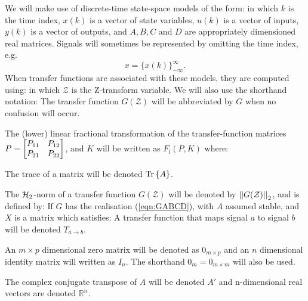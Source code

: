 \label{sec:notation}
We will make use of discrete-time state-space models of the form:
in which $k$ is the time index, $x(k)$ is a vector of state variables, $u(k)$ is a vector of inputs, $y(k)$ is a vector of outputs, and $A,B,C$ and $D$ are appropriately dimensioned real matrices. Signals will sometimes be represented by omitting the time index, e.g.
$$x=\{x(k)\}^{\infty}_{-\infty}.$$
When transfer functions are associated with these models, they are computed using:
in which $\mathcal{Z}$ is the Z-transform variable. We will also use the shorthand notation:
The transfer function $G(\mathcal{Z})$ will be abbreviated by $G$ when no confusion will occur.

The (lower) linear fractional transformation of the transfer-function matrices $P=\begin{bmatrix} P_{11} &P_{12}\\P_{21} & P_{22} \end{bmatrix}$, and $K$ will be written as $F_l(P,K)$ where: 

The trace of a matrix will be denoted $\textrm{Tr}\left\{ A \right\}$.
 
The $\mathcal H_2$-norm of a transfer function $G(\mathcal{Z})$ will be denoted by $\left|\left| G(\mathcal{Z}) \right|\right|_2$, and is defined by:
If $G$ has the realisation (\ref{eqn:GABCD}), with $A$ assumed stable, and $X$ is a matrix which satisfies:
%
A transfer function that maps signal $a$ to signal $b$ will be denoted $T_{a\rightarrow b}$.

An $m\times p$ dimensional zero matrix will be denoted as $0_{m\times p}$ and an $n$ dimensional identity matrix will written as $I_n$. The shorthand $0_m=0_{m\times m}$ will also be used. %

The complex conjugate transpose of $A$ will be denoted $A'$ and n-dimensional real vectors are denoted $\mathbb{R}^n$.


